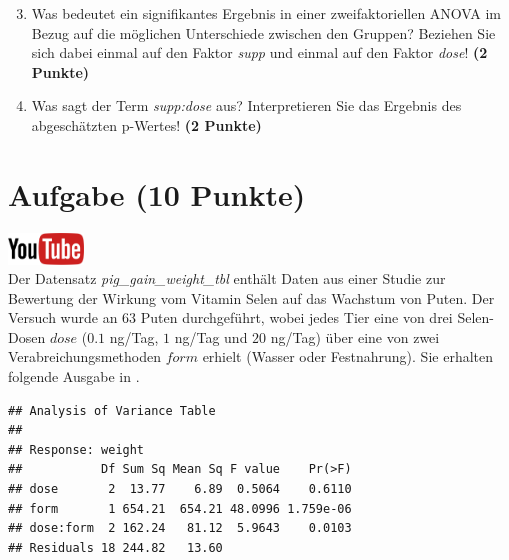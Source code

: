 \documentclass[a4paper, 9pt]{scrartcl}\usepackage[]{graphicx}\usepackage[]{xcolor}
\makeatletter
\newenvironment{kframe}{%
 \def\at@end@of@kframe{}%
 \ifinner\ifhmode%
  \def\at@end@of@kframe{\end{minipage}}%
  \begin{minipage}{\columnwidth}%
 \fi\fi%
 \def\FrameCommand##1{\hskip\@totalleftmargin \hskip-\fboxsep
 \colorbox{shadecolor}{##1}\hskip-\fboxsep
     \hskip-\linewidth \hskip-\@totalleftmargin \hskip\columnwidth}%
 \MakeFramed {\advance\hsize-\width
   \@totalleftmargin\z@ \linewidth\hsize
   \@setminipage}}%
 {\par\unskip\endMakeFramed%
 \at@end@of@kframe}
\newenvironment{knitrout}{}{} %
\makeatother
\begin{document}
\vspace{1Ex}

\begin{enumerate}
  \setcounter{enumi}{2}
\item Was bedeutet ein signifikantes Ergebnis in einer zweifaktoriellen
  ANOVA im Bezug auf die m{\"o}glichen Unterschiede zwischen den Gruppen?
  Beziehen Sie sich dabei einmal auf den Faktor \textit{supp} und einmal
  auf den Faktor \textit{dose}! \textbf{(2 Punkte)}
\item Was sagt der Term \textit{supp:dose} aus? Interpretieren Sie das
  Ergebnis des abgesch{\"a}tzten p-Wertes! \textbf{(2 Punkte)}
\end{enumerate}
 
\clearpage

\section{Aufgabe \hfill (10 Punkte)}

\hfill\href{https://youtu.be/rWTyHXXlYjY}{\includegraphics[width =
  2cm]{img/youtube}}\\[1Ex]



Der Datensatz \textit{pig\_gain\_weight\_tbl} enth{\"a}lt Daten aus einer Studie zur Bewertung
der Wirkung vom Vitamin Selen auf das Wachstum von Puten. Der
Versuch wurde an 63 Puten durchgef{\"u}hrt, wobei
jedes Tier eine von drei Selen-Dosen $dose$ ($0.1$ ng/Tag, $1$ ng/Tag und $20$ ng/Tag)
{\"u}ber eine von zwei Verabreichungsmethoden $form$ erhielt (Wasser oder
Festnahrung). Sie erhalten folgende Ausgabe in \Rlogo.

\begin{knitrout}
\color{fgcolor}\begin{kframe}
\begin{verbatim}
## Analysis of Variance Table
## 
## Response: weight
##           Df Sum Sq Mean Sq F value    Pr(>F)
## dose       2  13.77    6.89  0.5064    0.6110
## form       1 654.21  654.21 48.0996 1.759e-06
## dose:form  2 162.24   81.12  5.9643    0.0103
## Residuals 18 244.82   13.60
\end{verbatim}
\end{kframe}
\end{knitrout}
\end{document}

